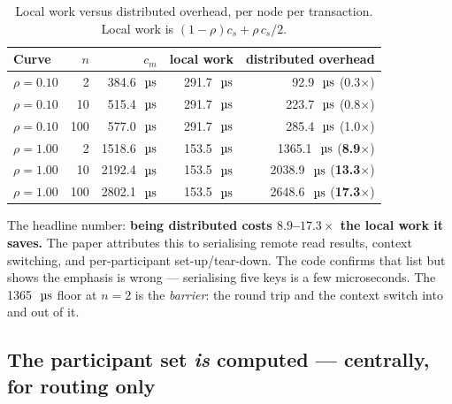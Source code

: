 \documentclass[11pt,a4paper]{article}
\newcommand{\msecs}{\ensuremath{\,\text{\textmu}\text{s}}}
\begin{document}
\begin{table}[H]
\centering
\caption{Local work versus distributed overhead, per node per transaction.
Local work is $(1-\rho)c_s+\rho\,c_s/2$.}
\label{tab:overhead}
\begin{tabular}{@{}lrrrr@{}}
\toprule
\textbf{Curve} & \textbf{$n$} & \textbf{$c_m$} & \textbf{local work} &
\textbf{distributed overhead} \\
\midrule
$\rho{=}0.10$ &  2 & \SI{384.6}{\msecs} & \SI{291.7}{\msecs} & \SI{92.9}{\msecs}\phantom{0} (0.3$\times$) \\
$\rho{=}0.10$ & 10 & \SI{515.4}{\msecs} & \SI{291.7}{\msecs} & \SI{223.7}{\msecs}\phantom{0} (0.8$\times$) \\
$\rho{=}0.10$ & 100 & \SI{577.0}{\msecs} & \SI{291.7}{\msecs} & \SI{285.4}{\msecs}\phantom{0} (1.0$\times$) \\
\midrule
$\rho{=}1.00$ &  2 & \SI{1518.6}{\msecs} & \SI{153.5}{\msecs} & \SI{1365.1}{\msecs} (\textbf{8.9$\times$}) \\
$\rho{=}1.00$ & 10 & \SI{2192.4}{\msecs} & \SI{153.5}{\msecs} & \SI{2038.9}{\msecs} (\textbf{13.3$\times$}) \\
$\rho{=}1.00$ & 100 & \SI{2802.1}{\msecs} & \SI{153.5}{\msecs} & \SI{2648.6}{\msecs} (\textbf{17.3$\times$}) \\
\bottomrule
\end{tabular}
\end{table}

The headline number: \textbf{being distributed costs $8.9$--$17.3\times$ the
local work it saves.} The paper attributes this to serialising remote read
results, context switching, and per-participant set-up/tear-down. The code
confirms that list but shows the emphasis is wrong --- serialising five keys is
a few microseconds. The \SI{1365}{\msecs} floor at $n{=}2$ is the
\emph{barrier}: the round trip and the context switch into and out of it.

\subsection{The participant set \emph{is} computed --- centrally, for routing only}
\end{document}
